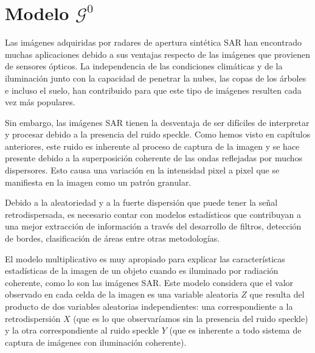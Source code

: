 
\chapter{Modelo $\mathcal{G}^0$}
\label{modeloG0}

Las imágenes adquiridas por radares de apertura sintética SAR han encontrado muchas aplicaciones debido a sus ventajas respecto de las imágenes que provienen de sensores ópticos. La independencia de las condiciones climáticas y de la iluminación junto con la capacidad de penetrar la nubes, las copas de los árboles e incluso el suelo, han contribuido para que este tipo de imágenes resulten cada vez más populares.

Sin embargo, las imágenes SAR tienen la desventaja de ser difíciles de interpretar y procesar debido a la presencia del ruido speckle. Como hemos visto en capítulos anteriores, este ruido es inherente al proceso de captura de la imagen y se hace presente debido a la superposición coherente de las ondas reflejadas por muchos dispersores. Esto causa una variación en la intensidad pixel a pixel que se manifiesta en la imagen como un patrón granular. 

Debido a la aleatoriedad y a la fuerte dispersión que puede tener la señal retrodispersada, es necesario contar con modelos estadísticos que contribuyan a una mejor extracción de información a través del desarrollo de filtros, detección de bordes, clasificación de áreas entre otras metodologías. 

El modelo multiplicativo es muy apropiado para explicar las características estadísticas de la imagen de un objeto cuando es iluminado por radiación coherente, como lo son las imágenes SAR.
Este modelo considera que el valor observado en cada celda de la imagen es una variable aleatoria $Z$ que resulta del producto de dos variables aleatorias independientes: una correspondiente a la retrodispersión $X$ (que es lo que observaríamos sin la presencia del ruido speckle) y la otra correspondiente al ruido speckle $Y$ (que es inherente a todo sistema de captura de imágenes con iluminación coherente).

